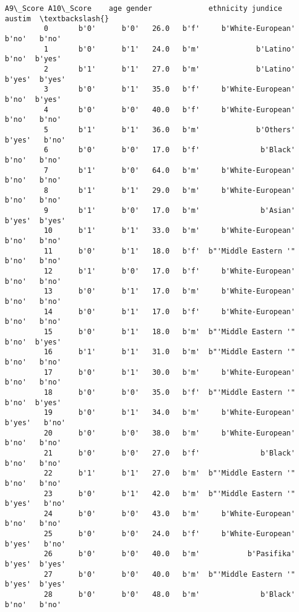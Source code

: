 \documentclass[11pt]{article}
\begin{document}
\begin{Verbatim}[commandchars=\\\{\}]
             A9\_Score A10\_Score    age gender             ethnicity jundice  austim  \textbackslash{}
         0       b'0'      b'0'   26.0   b'f'     b'White-European'   b'no'   b'no'   
         1       b'0'      b'1'   24.0   b'm'             b'Latino'   b'no'  b'yes'   
         2       b'1'      b'1'   27.0   b'm'             b'Latino'  b'yes'  b'yes'   
         3       b'0'      b'1'   35.0   b'f'     b'White-European'   b'no'  b'yes'   
         4       b'0'      b'0'   40.0   b'f'     b'White-European'   b'no'   b'no'   
         5       b'1'      b'1'   36.0   b'm'             b'Others'  b'yes'   b'no'   
         6       b'0'      b'0'   17.0   b'f'              b'Black'   b'no'   b'no'   
         7       b'1'      b'0'   64.0   b'm'     b'White-European'   b'no'   b'no'   
         8       b'1'      b'1'   29.0   b'm'     b'White-European'   b'no'   b'no'   
         9       b'1'      b'0'   17.0   b'm'              b'Asian'  b'yes'  b'yes'   
         10      b'1'      b'1'   33.0   b'm'     b'White-European'   b'no'   b'no'   
         11      b'0'      b'1'   18.0   b'f'  b"'Middle Eastern '"   b'no'   b'no'   
         12      b'1'      b'0'   17.0   b'f'     b'White-European'   b'no'   b'no'   
         13      b'0'      b'1'   17.0   b'm'     b'White-European'   b'no'   b'no'   
         14      b'0'      b'1'   17.0   b'f'     b'White-European'   b'no'   b'no'   
         15      b'0'      b'1'   18.0   b'm'  b"'Middle Eastern '"   b'no'  b'yes'   
         16      b'1'      b'1'   31.0   b'm'  b"'Middle Eastern '"   b'no'   b'no'   
         17      b'0'      b'1'   30.0   b'm'     b'White-European'   b'no'   b'no'   
         18      b'0'      b'0'   35.0   b'f'  b"'Middle Eastern '"   b'no'  b'yes'   
         19      b'0'      b'1'   34.0   b'm'     b'White-European'  b'yes'   b'no'   
         20      b'0'      b'0'   38.0   b'm'     b'White-European'   b'no'   b'no'   
         21      b'0'      b'0'   27.0   b'f'              b'Black'   b'no'   b'no'   
         22      b'1'      b'1'   27.0   b'm'  b"'Middle Eastern '"   b'no'   b'no'   
         23      b'0'      b'1'   42.0   b'm'  b"'Middle Eastern '"  b'yes'   b'no'   
         24      b'0'      b'0'   43.0   b'm'     b'White-European'   b'no'   b'no'   
         25      b'0'      b'0'   24.0   b'f'     b'White-European'  b'yes'   b'no'   
         26      b'0'      b'0'   40.0   b'm'           b'Pasifika'  b'yes'  b'yes'   
         27      b'0'      b'0'   40.0   b'm'  b"'Middle Eastern '"  b'yes'  b'yes'   
         28      b'0'      b'0'   48.0   b'm'              b'Black'   b'no'   b'no'   

\end{Verbatim}
\end{document}
